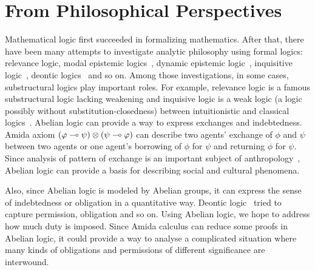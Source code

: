 \section{From Philosophical Perspectives}

Mathematical logic first succeeded in formalizing mathematics.
After that, there have been many attempts to investigate analytic
philosophy
using formal logics: relevance logic, modal epistemic
logics~\citep{sep-logic-epistemic},
dynamic epistemic logic~\citep{ditmarsch2007dynamic},
inquisitive logic~\citep{ciardelli2011},
deontic logics~\citep{von1951deontic} and
so on.  Among those investigations, in some cases, substructural logics
play important roles.  For example, relevance logic is a famous
substructural logic lacking weakening and inquisive logic is a weak
logic (a logic possibly without substitution-closedness) between
intuitionistic and classical logics~\citep{ciardelli2011}.
Abelian logic can provide a way to express
exchanges and indebtedness.  Amida axiom $(\varphi\multimap
\psi)\otimes(\psi\multimap\varphi)$
can describe two agents' exchange of $\phi$ and $\psi$ between two agents
or one agent's borrowing of $\phi$ for $\psi$ and returning $\phi$ for
$\psi$.
Since analysis of pattern of exchange is an important subject of
anthropology~\citep{kula1920}, Abelian logic can provide a
basis for describing social and cultural phenomena.

Also, since Abelian logic is modeled by Abelian groups, it can express the
sense of indebtedness or obligation in a quantitative way.
Deontic logic~\citep{von1951deontic,sep-logic-deontic} tried to capture permission,
obligation and so on.
Using Abelian logic, we hope to address how much duty is imposed.
Since Amida calculus can reduce some proofs in Abelian logic, it could
provide a way to analyse a complicated situation where many kinds of
obligations and permissions of different significance are interwound.
